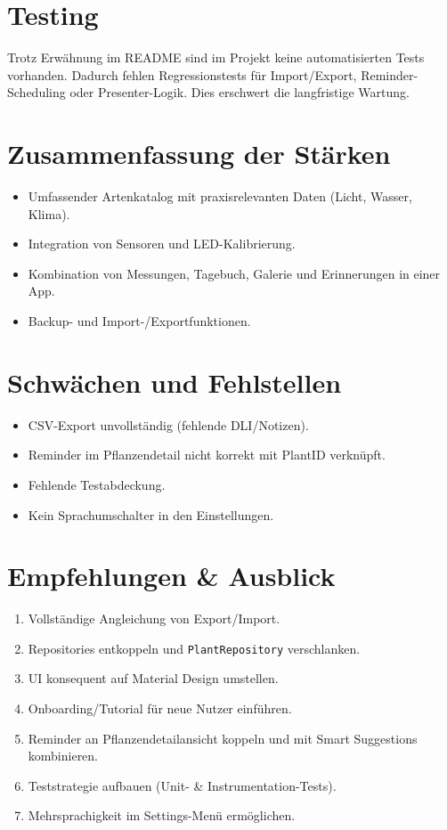 \documentclass[14pt,a4paper]{report}
\begin{document}
\section{Testing}
Trotz Erwähnung im README sind im Projekt keine automatisierten Tests vorhanden. 
Dadurch fehlen Regressionstests für Import/Export, Reminder-Scheduling oder Presenter-Logik. 
Dies erschwert die langfristige Wartung.

\section{Zusammenfassung der Stärken}
\begin{itemize}
    \item Umfassender Artenkatalog mit praxisrelevanten Daten (Licht, Wasser, Klima).
    \item Integration von Sensoren und LED-Kalibrierung.
    \item Kombination von Messungen, Tagebuch, Galerie und Erinnerungen in einer App.
    \item Backup- und Import-/Exportfunktionen.
\end{itemize}

\section{Schwächen und Fehlstellen}
\begin{itemize}
    \item CSV-Export unvollständig (fehlende DLI/Notizen).
    \item Reminder im Pflanzendetail nicht korrekt mit PlantID verknüpft.
    \item Fehlende Testabdeckung.
    \item Kein Sprachumschalter in den Einstellungen.
\end{itemize}

\section{Empfehlungen \& Ausblick}
\begin{enumerate}
    \item Vollständige Angleichung von Export/Import.
    \item Repositories entkoppeln und \texttt{PlantRepository} verschlanken.
    \item UI konsequent auf Material Design umstellen.
    \item Onboarding/Tutorial für neue Nutzer einführen.
    \item Reminder an Pflanzendetailansicht koppeln und mit Smart Suggestions kombinieren.
    \item Teststrategie aufbauen (Unit- \& Instrumentation-Tests).
    \item Mehrsprachigkeit im Settings-Menü ermöglichen.
\end{enumerate}
\end{document}
